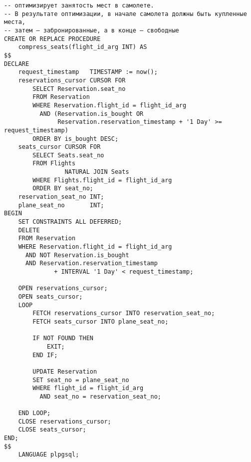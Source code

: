 \documentclass{article}
\begin{document}
\begin{verbatim}
-- оптимизирует занятость мест в самолете.
-- В результате оптимизации, в начале самолета должны быть купленные места,
-- затем — забронированные, а в конце — свободные
CREATE OR REPLACE PROCEDURE
    compress_seats(flight_id_arg INT) AS
$$
DECLARE
    request_timestamp   TIMESTAMP := now();
    reservations_cursor CURSOR FOR
        SELECT Reservation.seat_no
        FROM Reservation
        WHERE Reservation.flight_id = flight_id_arg
          AND (Reservation.is_bought OR
               Reservation.reservation_timestamp + '1 Day' >= request_timestamp)
        ORDER BY is_bought DESC;
    seats_cursor CURSOR FOR
        SELECT Seats.seat_no
        FROM Flights
                 NATURAL JOIN Seats
        WHERE Flights.flight_id = flight_id_arg
        ORDER BY seat_no;
    reservation_seat_no INT;
    plane_seat_no       INT;
BEGIN
    SET CONSTRAINTS ALL DEFERRED;
    DELETE
    FROM Reservation
    WHERE Reservation.flight_id = flight_id_arg
      AND NOT Reservation.is_bought
      AND Reservation.reservation_timestamp
              + INTERVAL '1 Day' < request_timestamp;

    OPEN reservations_cursor;
    OPEN seats_cursor;
    LOOP
        FETCH reservations_cursor INTO reservation_seat_no;
        FETCH seats_cursor INTO plane_seat_no;

        IF NOT FOUND THEN
            EXIT;
        END IF;

        UPDATE Reservation
        SET seat_no = plane_seat_no
        WHERE flight_id = flight_id_arg
          AND seat_no = reservation_seat_no;

    END LOOP;
    CLOSE reservations_cursor;
    CLOSE seats_cursor;
END;
$$
    LANGUAGE plpgsql;
\end{verbatim}
\end{document}
